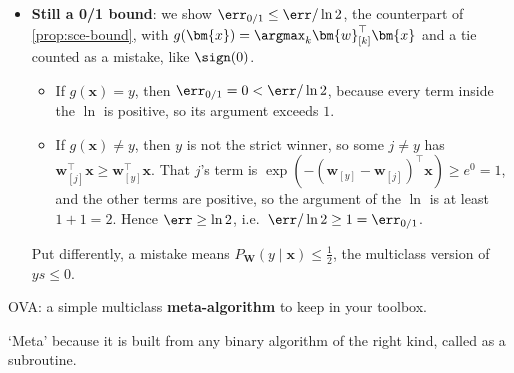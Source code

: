\begin{remark}
\begin{itemize}
\[            \]
            Put \(\bm{w} = \bm{w}_{[+1]} - \bm{w}_{[-1]}\). For \(y = +1\),
            \(\bm{w}_{[y]} - \bm{w}_{[-y]} = \bm{w}\); for \(y = -1\) it is
            \(-\bm{w}\). In both cases it equals \(y \bm{w}\), and \(\err =
            \ln(1 + \exp(-y \bm{w}^\top \bm{x}))\). Likewise
            \(P_{\bm{W}}(+1 \mid \bm{x}) = 1 / (1 + \exp(-\bm{w}^\top
            \bm{x})) = \theta(\bm{w}^\top \bm{x})\): only the difference of
            the two weight vectors matters, and binary logistic regression
            learns exactly that difference.
        \item \textbf{Still a 0/1 bound}: we show \(\err_{0/1} \le \err / \ln
            2\), the counterpart of \autoref{prop:sce-bound}, with
            \(g(\bm{x}) = \argmax_k \bm{w}_{[k]}^\top \bm{x}\) and a tie
            counted as a mistake, like \(\sign(0)\).
            \begin{itemize}
                \item If \(g(\bm{x}) = y\), then \(\err_{0/1} = 0 < \err / \ln
                    2\), because every term inside the \(\ln\) is positive,
                    so its argument exceeds \(1\).
                \item If \(g(\bm{x}) \neq y\), then \(y\) is not the strict
                    winner, so some \(j \neq y\) has \(\bm{w}_{[j]}^\top
                    \bm{x} \ge \bm{w}_{[y]}^\top \bm{x}\). That \(j\)'s term
                    is \(\exp(-(\bm{w}_{[y]} - \bm{w}_{[j]})^\top \bm{x})
                    \ge e^0 = 1\), and the other terms are positive, so the
                    argument of the \(\ln\) is at least \(1 + 1 = 2\). Hence
                    \(\err \ge \ln 2\), i.e.\ \(\err / \ln 2 \ge 1 =
                    \err_{0/1}\).
            \end{itemize}
            Put differently, a mistake means \(P_{\bm{W}}(y \mid \bm{x}) \le
            \frac{1}{2}\), the multiclass version of \(ys \le 0\).
    \end{itemize}
\end{remark}

\begin{moral}
    OVA: a simple multiclass \textcolor{orange!85!black}{\textbf{meta-algorithm}}
    to keep in your toolbox.
\end{moral}

`Meta' because it is built from any binary algorithm of the right kind, called
as a subroutine.

